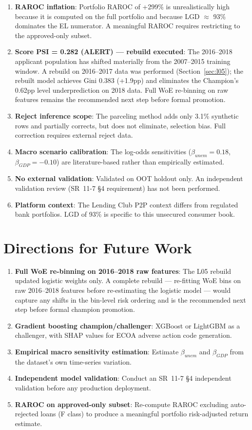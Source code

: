 \documentclass[12pt,a4paper]{report}
\begin{document}
\begin{enumerate}
  \item \textbf{RAROC inflation}: Portfolio RAROC of +299\% is unrealistically high because it is computed on the full portfolio and because LGD $\approx$ 93\% dominates the EL numerator. A meaningful RAROC requires restricting to the approved-only subset.
  \item \textbf{Score PSI = 0.282 (ALERT) --- rebuild executed}: The 2016--2018 applicant population has shifted materially from the 2007--2015 training window. A rebuild on 2016--2017 data was performed (Section~\ref{sec:l05}); the rebuilt model achieves Gini 0.383 (+1.9pp) and eliminates the Champion's 0.62pp level underprediction on 2018 data. Full WoE re-binning on raw features remains the recommended next step before formal promotion.
  \item \textbf{Reject inference scope}: The parceling method adds only 3.1\% synthetic rows and partially corrects, but does not eliminate, selection bias. Full correction requires external reject data.
  \item \textbf{Macro scenario calibration}: The log-odds sensitivities ($\beta_{unem} = 0.18$, $\beta_{GDP} = -0.10$) are literature-based \cite{bellotti2009} rather than empirically estimated.
  \item \textbf{No external validation}: Validated on OOT holdout only. An independent validation review (SR~11-7 \S4 requirement) has not been performed.
  \item \textbf{Platform context}: The Lending Club P2P context differs from regulated bank portfolios. LGD of 93\% is specific to this unsecured consumer book.
\end{enumerate}

\section{Directions for Future Work}

\begin{enumerate}
  \item \textbf{Full WoE re-binning on 2016--2018 raw features}: The L05 rebuild updated logistic weights only. A complete rebuild --- re-fitting WoE bins on raw 2016--2018 features before re-estimating the logistic model --- would capture any shifts in the bin-level risk ordering and is the recommended next step before formal champion promotion.
  \item \textbf{Gradient boosting champion/challenger}: XGBoost or LightGBM as a challenger, with SHAP values for ECOA adverse action code generation.
  \item \textbf{Empirical macro sensitivity estimation}: Estimate $\beta_{unem}$ and $\beta_{GDP}$ from the dataset's own time-series variation.
  \item \textbf{Independent model validation}: Conduct an SR~11-7 \S4 independent validation before any production deployment.
  \item \textbf{RAROC on approved-only subset}: Re-compute RAROC excluding auto-rejected loans (F class) to produce a meaningful portfolio risk-adjusted return estimate.
\end{enumerate}
\end{document}

